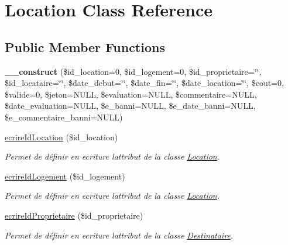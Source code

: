 \hypertarget{class_location}{}\section{Location Class Reference}
\label{class_location}
\subsection*{Public Member Functions}
\begin{DoxyCompactItemize}
\item 
\mbox{\label{class_location_a145cb8c86785c9085c17d207a9aadb87}} 
{\bfseries \+\_\+\+\_\+construct} (\$id\+\_\+location=0, \$id\+\_\+logement=0, \$id\+\_\+proprietaire=\char`\"{}\char`\"{}, \$id\+\_\+locataire=\char`\"{}\char`\"{}, \$date\+\_\+debut=\char`\"{}\char`\"{}, \$date\+\_\+fin=\char`\"{}\char`\"{}, \$date\+\_\+location=\char`\"{}\char`\"{}, \$cout=0, \$valide=0, \$jeton=N\+U\+LL, \$evaluation=N\+U\+LL, \$commentaire=N\+U\+LL, \$date\+\_\+evaluation=N\+U\+LL, \$e\+\_\+banni=N\+U\+LL, \$e\+\_\+date\+\_\+banni=N\+U\+LL, \$e\+\_\+commentaire\+\_\+banni=N\+U\+LL)
\item 
\hyperlink{class_location_a6ac3b0f3c8791cc6d7aca434d5e0e007}{ecrire\+Id\+Location} (\$id\+\_\+location)
\begin{DoxyCompactList}\small\item\em Permet de définir en ecriture l\textquotesingle{}attribut de la classe \hyperlink{class_location}{Location}. \end{DoxyCompactList}\item 
\hyperlink{class_location_a1972513b78fac42cde85148c7c8af005}{ecrire\+Id\+Logement} (\$id\+\_\+logement)
\begin{DoxyCompactList}\small\item\em Permet de définir en ecriture l\textquotesingle{}attribut de la classe \hyperlink{class_location}{Location}. \end{DoxyCompactList}\item 
\hyperlink{class_location_a7d047747d2fe3745641adee427b1b6e0}{ecrire\+Id\+Proprietaire} (\$id\+\_\+proprietaire)
\begin{DoxyCompactList}\small\item\em Permet de définir en ecriture l\textquotesingle{}attribut de la classe \hyperlink{class_destinataire}{Destinataire}. \end{DoxyCompactList}\item 

\end{DoxyCompactItemize}
